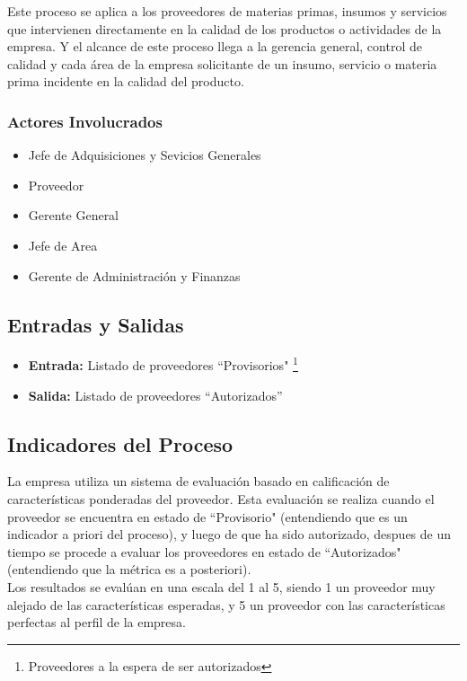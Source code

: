 \documentclass[12pt,letterpaper]{article}
\begin{document}
Este proceso se aplica a los proveedores de materias primas, insumos y servicios que intervienen directamente en la calidad de los productos o actividades de la empresa. Y el alcance de este proceso llega a la gerencia general, control de calidad y cada área de la empresa solicitante de un insumo, servicio o materia prima incidente en la calidad del producto.

\subsubsection{Actores Involucrados}
\begin{itemize}
\item{Jefe de Adquisiciones y Sevicios Generales}
\item{Proveedor}
\item{Gerente General}
\item{Jefe de Area}
\item{Gerente de Administración y Finanzas}
\end{itemize}

\subsection{Entradas y Salidas}
\begin{itemize}
\item{\textbf{Entrada:} Listado de proveedores ``Provisorios" \footnote{Proveedores a la espera de ser autorizados}}
\item{\textbf{Salida:} Listado de proveedores ``Autorizados'' }
\end{itemize}

\subsection{Indicadores del Proceso}
La empresa utiliza un sistema de evaluación basado en calificación de características ponderadas del proveedor. Esta evaluación se realiza cuando el proveedor se encuentra en estado de ``Provisorio" (entendiendo que es un indicador a priori del proceso), y luego de que ha sido autorizado, despues de un tiempo se procede a evaluar los proveedores en estado de ``Autorizados" (entendiendo que la métrica es a posteriori).\\

Los resultados se evalúan en una escala del 1 al 5, siendo 1 un proveedor muy alejado de las características esperadas, y 5 un proveedor con las características perfectas al perfil de la empresa.
\end{document}
